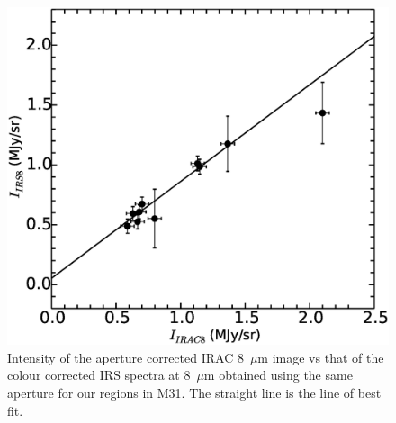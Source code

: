 \begin{figure}
\centering
\includegraphics[scale=0.25]{./offset.eps}
\caption{ Intensity of the aperture corrected IRAC 8~$\mu$m image vs that of the colour corrected IRS spectra at 8~$\mu$m  obtained using the same aperture for our regions in M31. The straight line is the line of best fit. }
\label{offset}
\end{figure}


